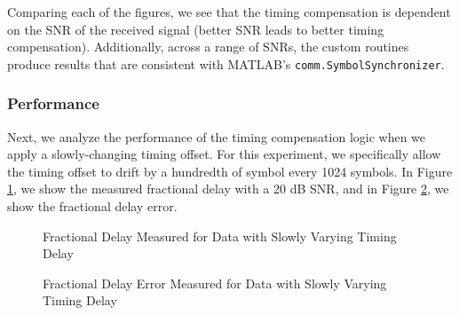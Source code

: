 \documentclass{article}
\begin{document}
\noindent Comparing each of the figures, we see that the timing compensation is dependent on the SNR of the received signal (better SNR leads to better timing compensation). Additionally, across a range of SNRs, the custom routines produce results that are consistent with MATLAB's \texttt{comm.SymbolSynchronizer}.

\subsubsection{Performance}

Next, we analyze the performance of the timing compensation logic when we apply a slowly-changing timing offset. For this experiment, we specifically allow the timing offset to drift by a hundredth of symbol every 1024 symbols. In Figure \ref{fig::fractional_delay_timing_offset}, we show the measured fractional delay with a 20 dB SNR, and in Figure \ref{fig::fractional_delay_error_timing_offset}, we show the fractional delay error.

\begin{figure}[H]
	\centerline{}
	\caption{Fractional Delay Measured for Data with Slowly Varying Timing Delay}
	\label{fig::fractional_delay_timing_offset}
\end{figure}

\begin{figure}[H]
	\centerline{}
	\caption{Fractional Delay Error Measured for Data with Slowly Varying Timing Delay}
	\label{fig::fractional_delay_error_timing_offset}
\end{figure}
\end{document}

